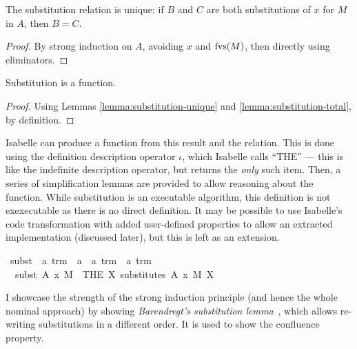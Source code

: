 \begin{lemma}
\label{lemma:substitution-unique}
The substitution relation is unique: if \(B\) and \(C\) are both substitutions of \(x\) for \(M\) in \(A\), then \(B = C\).
\end{lemma}
\begin{proof}
By strong induction on \(A\), avoiding \(x\) and \(\mathrm{fvs}(M)\), then directly using eliminators.
\end{proof}

\begin{lemma}
Substitution is a function.
\end{lemma}
\begin{proof}
Using Lemmas \ref{lemma:substitution-unique} and \ref{lemma:substitution-total}, by definition.
\end{proof}

Isabelle can produce a function from this result and the relation.
This is done using the definition description operator \(\iota\), which Isabelle calls ``THE'' --- this is like the indefinite description operator, but returns the \emph{only} such item.
Then, a series of simplification lemmas are provided to allow reasoning about the function.
While substitution is an executable algorithm, this definition is not exexecutable as there is no direct definition.
It may be possible to use Isabelle's code transformation with added user-defined properties to allow an extracted implementation (discussed later), but this is left as an extension.

\begin{implementation}
\isamarkupfalse%
\ subst\ {\isacharcolon}{\isacharcolon}\ {\isachardoublequoteopen}{\isacharprime}a\ trm\ {\isasymRightarrow}\ {\isacharprime}a\ {\isasymRightarrow}\ {\isacharprime}a\ trm\ {\isasymRightarrow}\ {\isacharprime}a\ trm{\isachardoublequoteclose}\ {\isacharparenleft}{\isachardoublequoteopen}{\isacharunderscore}{\isacharbrackleft}{\isacharunderscore}\ {\isacharcolon}{\isacharcolon}{\isacharequal}\ {\isacharunderscore}{\isacharbrackright}{\isachardoublequoteclose}{\isacharparenright}\ \isanewline
\ \ {\isachardoublequoteopen}subst\ A\ x\ M\ {\isasymequiv}\ {\isacharparenleft}THE\ X{\isachardot}\ substitutes\ A\ x\ M\ X{\isacharparenright}{\isachardoublequoteclose}
\end{implementation}

I showcase the strength of the strong induction principle (and hence the whole nominal approach) by showing \emph{Barendregt's substitution lemma}~\cite{lambda-overview}, which allows re-writing substitutions in a different order.
It is used to show the confluence property.

